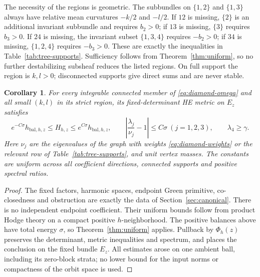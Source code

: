 \documentclass[11pt]{amsart}
\newtheorem{corollary}[theorem]{Corollary}
\theoremstyle{definition}
\theoremstyle{remark}
\begin{document}
The necessity of the regions is geometric. The subbundles on
$\{1,2\}$ and $\{1,3\}$ always have relative mean curvatures
$-k/2$ and $-l/2$. If $12$ is missing, $\{2\}$ is an additional
invariant subbundle and requires $b_2>0$; if $13$ is missing,
$\{3\}$ requires $b_3>0$. If $24$ is missing, the invariant subset
$\{1,3,4\}$ requires $-b_2>0$; if $34$ is missing,
$\{1,2,4\}$ requires $-b_3>0$. These are exactly the inequalities
in Table~\ref{tab:tree-supports}. Sufficiency follows from
Theorem~\ref{thm:uniform}, so no further destabilizing subsheaf reduces
the listed regions. On full support the region is $k,l>0$; disconnected
supports give direct sums and are never stable.

\begin{corollary}\label{cor:diamond-uniform}
For every integrable connected member of \eqref{eq:diamond-omega} and
all small $(k,l)$ in its strict region, its fixed-determinant HE metric
on $E_z$ satisfies
\[
 e^{-C\sigma}h_{\mathrm{bal},h,z}\le H_{h,z}
 \le e^{C\sigma}h_{\mathrm{bal},h,z},\qquad
 \left|\frac{\lambda_j}{\nu_j}-1\right|\le C\sigma\ (j=1,2,3),
 \qquad \lambda_4\ge\gamma.
\]
Here $\nu_j$ are the eigenvalues of the graph with weights
\eqref{eq:diamond-weights} or the relevant row of
Table~\ref{tab:tree-supports}, and unit vertex masses. The constants are
uniform across all coefficient directions, connected supports and positive
spectral ratios.
\end{corollary}

\begin{proof}
The fixed factors, harmonic spaces, endpoint Green primitive, co-closedness
and obstruction are exactly the data of Section~\ref{sec:canonical}.
There is no independent endpoint coefficient. Their uniform bounds follow
from product Hodge theory on a compact positive $h$-neighborhood. The
positive balances above have total energy $\sigma$, so
Theorem~\ref{thm:uniform} applies. Pullback by $\Phi_h(z)$ preserves
the determinant, metric inequalities and spectrum, and places the conclusion
on the fixed bundle $E_z$. All estimates arose on one ambient ball,
including its zero-block strata; no lower bound for the input norms or
compactness of the orbit space is used.
\end{proof}
\end{document}
